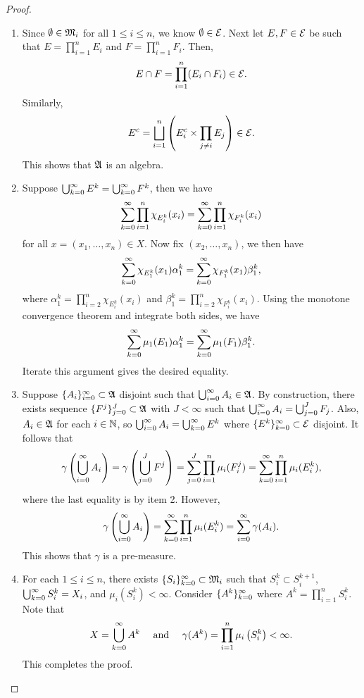 \documentclass[a4paper]{article}
\begin{document}
\begin{proof}
\begin{enumerate}
\item Since $\emptyset \in \mathfrak{M}_i$ for all $1 \leq i \leq n$,
we know $\emptyset \in \mathcal{E}$. Next let $E, F \in \mathcal{E}$ be
such that $E = \prod_{i=1}^n E_i$ and $F = \prod_{i=1}^n
F_i$. Then,
\[
E \cap F = \prod_{i=1}^n (E_i \cap F_i) \in \mathcal{E}.
\]
Similarly,
\[
E^c = \bigsqcup_{i=1}^n \left( E_i^c
\times \prod_{j \neq i} E_j \right) \in \mathcal{E}.
\]
This shows that $\mathfrak{A}$ is an algebra.

\item Suppose $\bigcup_{k=0}^\infty E^k = \bigcup_{k=0}^\infty F^k$, then we have
\[
\sum_{k=0}^\infty \prod_{i=1}^n \chi_{E_i^k}(x_i)
= \sum_{k=0}^\infty \prod_{i=1}^n \chi_{F_i^k}(x_i)
\]
for all $x = (x_1, \dots, x_n) \in X$.
Now fix $(x_2, \dots, x_n)$, we then have
\[
\sum_{k=0}^\infty \chi_{E^k_1}(x_1) \alpha_1^k
= \sum_{k=0}^\infty \chi_{F^k_1}(x_1) \beta_1^k,
\]
where
$\alpha_1^k = \prod_{i=2}^n \chi_{E_i^k} (x_i)$ and
$\beta_1^k = \prod_{i=2}^n \chi_{F_i^k} (x_i)$.
Using the monotone convergence theorem and integrate
both sides, we have
\[
\sum_{k=0}^\infty \mu_1(E_1) \alpha_1^k
= \sum_{k=0}^\infty \mu_1(F_1) \beta_1^k.
\]
Iterate this argument gives the desired equality.

\item Suppose $\{ A_i \}_{i=0}^\infty \subset \mathfrak{A}$ disjoint such that
$\bigcup_{i=0}^\infty A_i \in \mathfrak{A}$. By construction, there exists
sequence $\{ F^j \}_{j=0}^J \subset \mathfrak{A}$ with $J < \infty$ such that
$\bigcup_{i=0}^\infty{A_i} = \bigcup_{j=0}^J F_j$. Also, $A_i \in \mathfrak{A}$
for each $i \in \mathbb{N}$, so $\bigcup_{i=0}^\infty A_i = \bigcup_{k=0}^\infty E^k$
where $\{ E^k \}_{k=0}^\infty \subset \mathcal{E}$ disjoint.
It follows that
\[
\gamma \left( \bigcup_{i=0}^\infty A_i \right)
= \gamma \left( \bigcup_{j=0}^J F^j \right)
= \sum_{j=0}^J \prod_{i=1}^n \mu_i ( F_i^j )
= \sum_{k=0}^\infty \prod_{i=1}^n \mu_i (E_i^k),
\]
where the last equality is by item 2. However,
\[
\gamma \left( \bigcup_{i=0}^\infty A_i \right)
= \sum_{k=0}^\infty \prod_{i=1}^n \mu_i (E_i^k)
= \sum_{i=0}^\infty \gamma (A_i).
\]
This shows that $\gamma$ is a pre-measure.

\item For each $1 \leq i \leq n$, there exists
$\{ S_i \}_{k=0}^\infty \subset \mathfrak{M}_i$ such that
$S_i^k \subset S_i^{k+1}$,
$\bigcup_{k=0}^\infty S_i^k = X_i$, and $\mu_i(S_i^k) < \infty$.
Consider $\{ A^k \}_{k=0}^\infty$ where $A^k = \prod_{i=1}^n S_i^k$.
Note that
\[
X = \bigcup_{k=0}^\infty A^k \quad \text{ and } \quad
\gamma(A^k) = \prod_{i=1}^n \mu_i \left( S_i^k \right) < \infty.
\]
This completes the proof.

\end{enumerate}
\end{proof}
\end{document}
